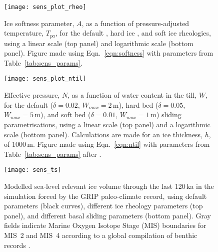 \begin{figure}
    \centering
    \texttt{[image: sens\_plot\_rheo]}
    \caption{Ice softness parameter, $A$, as a function of pressure-adjusted
             temperature, $T_{pa}$, for the default \citep{Paterson.Budd.1982},
             hard ice \citep[with $E_{SIA}=1$]{Cuffey.Paterson.2010}, and soft ice
             \citep[with $E_{SIA}=5$]{Cuffey.Paterson.2010} rheologies, using
             a linear scale (top panel) and logarithmic scale (bottom panel).
             Figure made using Eqn.~\ref{eqn:softness} with parameters from
             Table~\ref{tab:sens_params}.}
    \label{fig:sens_plot_rheo}
\end{figure}

\begin{figure}
    \centering
    \texttt{[image: sens\_plot\_ntil]}
    \caption{Effective pressure, $N$, as a function of water content in the
             till, $W$, for the default ($\delta=0.02$, $W_{max}=2$\,m),
             hard bed ($\delta=0.05$, $W_{max}=5$\,m), and soft bed
             ($\delta=0.01$, $W_{max}=1$\,m) sliding parametrisations, using a
             linear scale (top panel) and a logarithmic scale (bottom panel).
             Calculations are made for an ice thickness, $h$, of 1000\,m.
             Figure made using Eqn.~\ref{eqn:ntil} with parameters from
             Table~\ref{tab:sens_params} after
             \citet[Fig.~1]{Bueler.Pelt.2015}.}
    \label{fig:sens_plot_ntil}
\end{figure}

\begin{figure*}
  \centering
  \texttt{[image: sens\_ts]}
  \caption{Modelled sea-level relevant ice volume through the last 120\,ka
           in the simulation forced by the GRIP paleo-climate record, using
           default parameters (black curves), different ice rheology parameters
           (top panel), and different basal sliding parameters (bottom panel).
           Gray fields indicate Marine Oxygen Isotope Stage (MIS) boundaries
           for MIS~2 and MIS~4 according to a global compilation of benthic
            records \citep{Lisiecki.Raymo.2005}.}
  \label{fig:sens_ts}
\end{figure*}


